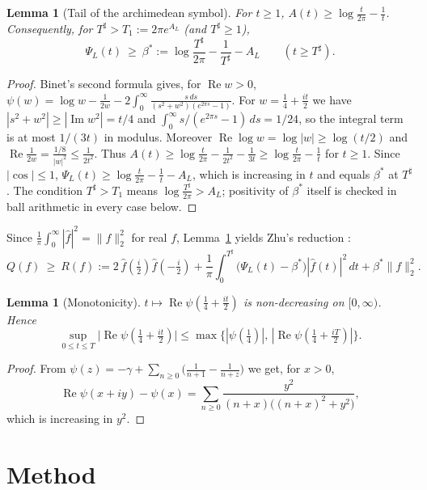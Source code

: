 \documentclass[11pt,a4paper]{article}
\newtheorem{lemma}[theorem]{Lemma}
\theoremstyle{remark}
\theoremstyle{definition}
\renewcommand{\Re}{\operatorname{Re}}
\renewcommand{\Im}{\operatorname{Im}}
\begin{document}
\begin{lemma}[Tail of the archimedean symbol]\label{lem:binet}
For $t\ge1$, $A(t)\ge\log\frac t{2\pi}-\frac1t$. Consequently, for $T^\sharp>T_1:=2\pi e^{A_L}$ (and $T^\sharp\ge1$),
\[
\Psi_L(t)\ \ge\ \beta^*:=\log\frac{T^\sharp}{2\pi}-\frac1{T^\sharp}-A_L\qquad (t\ge T^\sharp).
\]
\end{lemma}
\begin{proof}
Binet's second formula gives, for $\Re w>0$, $\psi(w)=\log w-\frac1{2w}-2\int_0^\infty\frac{s\,ds}{(s^2+w^2)(e^{2\pi s}-1)}$. For $w=\frac14+\frac{it}2$ we have $|s^2+w^2|\ge|\Im w^2|=t/4$ and $\int_0^\infty s/(e^{2\pi s}-1)\,ds=1/24$, so the integral term is at most $1/(3t)$ in modulus. Moreover $\Re\log w=\log|w|\ge\log(t/2)$ and $\Re\frac1{2w}=\frac{1/8}{|w|^2}\le\frac1{2t^2}$. Thus $A(t)\ge\log\frac t{2\pi}-\frac1{2t^2}-\frac1{3t}\ge\log\frac t{2\pi}-\frac1t$ for $t\ge1$. Since $|\cos|\le1$, $\Psi_L(t)\ge\log\frac t{2\pi}-\frac1t-A_L$, which is increasing in $t$ and equals $\beta^*$ at $T^\sharp$. The condition $T^\sharp>T_1$ means $\log\frac{T^\sharp}{2\pi}>A_L$; positivity of $\beta^*$ itself is checked in ball arithmetic in every case below.
\end{proof}

Since $\frac1\pi\int_0^\infty|\hat f|^2=\|f\|_2^2$ for real $f$, Lemma~\ref{lem:binet} yields Zhu's reduction \cite{Zhu26}:
\begin{equation}\label{eq:R}
Q(f)\ \ge\ R(f):=2\,\hat f(\tfrac i2)\hat f(-\tfrac i2)+\frac1\pi\int_0^{T^\sharp}\bigl(\Psi_L(t)-\beta^*\bigr)|\hat f(t)|^2\,dt+\beta^*\|f\|_2^2 .
\end{equation}

\begin{lemma}[Monotonicity]\label{lem:mono}
$t\mapsto\Re\psi(\frac14+\frac{it}2)$ is non-decreasing on $[0,\infty)$. Hence
\[\sup_{0\le t\le T}\bigl|\Re\psi(\tfrac14+\tfrac{it}2)\bigr|\le\max\bigl\{|\psi(\tfrac14)|,\,|\Re\psi(\tfrac14+\tfrac{iT}2)|\bigr\}.\]
\end{lemma}
\begin{proof}
From $\psi(z)=-\gamma+\sum_{n\ge0}\bigl(\frac1{n+1}-\frac1{n+z}\bigr)$ we get, for $x>0$,
\[\Re\psi(x+iy)-\psi(x)=\sum_{n\ge0}\frac{y^2}{(n+x)\bigl((n+x)^2+y^2\bigr)},\]
which is increasing in $y^2$.
\end{proof}

\section{Method}\label{sec:method}
\end{document}
